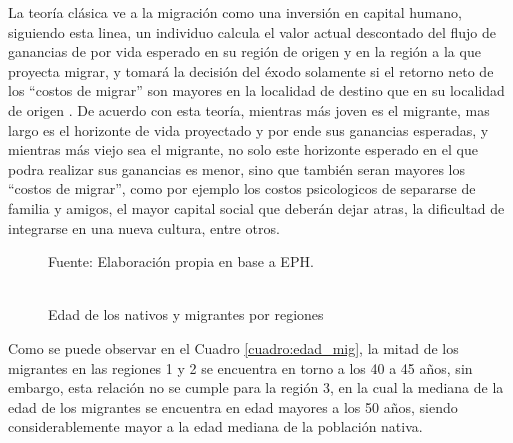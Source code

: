 \documentclass[12pt,a4paper]{article}
\begin{document}
La teoría clásica ve a la migración como una inversión en capital humano, siguiendo esta linea, un individuo calcula el valor actual descontado del flujo de ganancias de por vida esperado en su región de origen y en la región a la que proyecta migrar, y tomará la decisión del éxodo solamente si el retorno neto de los ``costos de migrar'' son mayores en la localidad de destino que en su localidad de origen \parencite{zaiceva_impact_2014}. De acuerdo con esta teoría, mientras más joven es el migrante, mas largo es el horizonte de vida proyectado y por ende sus ganancias esperadas, y mientras más viejo sea el migrante, no solo este horizonte esperado en el que podra realizar sus ganancias es menor, sino que también seran mayores  los ``costos de migrar'', como por ejemplo los costos psicologicos de separarse de familia y amigos, el mayor capital social que deberán dejar atras, la dificultad de integrarse en una nueva cultura, entre otros.

\begin{figure}[ht!]
\begin{center}
\caption{\\Edad de los nativos y migrantes por regiones}
 
\label{figure:edad_mig}
\begin{flushleft}
\begin{scriptsize}
Fuente: Elaboración propia en base a EPH.
\end{scriptsize}
\end{flushleft}
\end{center}
\end{figure}
\newpage
Como se puede observar en el Cuadro \ref{cuadro:edad_mig}, la mitad de los migrantes en las regiones 1 y 2 se encuentra en torno a los 40 a 45 años, sin embargo, esta relación no se cumple para la región 3, en la cual la mediana de la edad de los migrantes se encuentra en edad mayores a los 50 años, siendo considerablemente mayor a la edad mediana de la población nativa.
\end{document}
